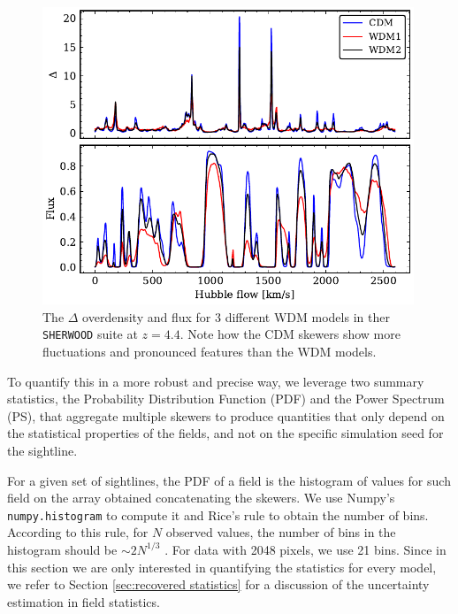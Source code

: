 \begin{figure}[ht]
        \centering
            \includegraphics[width=0.99\textwidth]{img/ML/skewer_delta_flux.pdf}
            \caption{The $\Delta$ overdensity and flux for 3 different WDM models in ther \texttt{SHERWOOD} suite at $z=4.4$. Note how the CDM skewers show more fluctuations and pronounced features than the WDM models.}
            \label{fig: skewer delta flux}
\end{figure}
To quantify this in a more robust and precise way, we leverage two summary statistics, the Probability Distribution Function (PDF) and the Power Spectrum (PS), that aggregate multiple skewers to produce quantities that only depend on the statistical properties of the fields, and not on the specific simulation seed for the sightline.

For a given set of sightlines, the PDF of a field is the histogram of values for such field on the array obtained concatenating the skewers. We use Numpy's \texttt{numpy.histogram} to compute it and Rice's rule to obtain the number of bins. According to this rule, for $N$ observed values, the number of bins in the histogram should be $\sim 2N^{1/3}$ \cite{Freedman1981}. For data with 2048 pixels, we use 21 bins. Since in this section we are only interested in quantifying the statistics for every model, we refer to Section \ref{sec:recovered statistics} for a discussion of the uncertainty estimation in field statistics.


